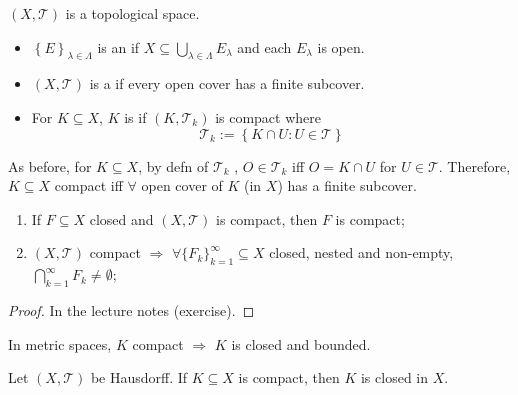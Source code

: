  \begin{defn} 
    $(X, \mathcal{T})$ is a topological space. 
    \begin{itemize}
        \item $\left\{ E \right\}_{\lambda \in \Lambda}$ is an  if 
        $X \subseteq \bigcup_{\lambda \in \Lambda} E_\lambda$ and each $E_\lambda$ is open.
        \item $(X, \mathcal{T})$ is a  if every open cover has a 
        finite subcover.   
        \item For $K \subseteq X$, $K$ is  if $(K, \mathcal{T}_k)$ is compact where
        \[
            \mathcal{T}_k := \left\{ K \cap U : U \in \mathcal{T} \right\} 
        \]    
    \end{itemize} 
 \end{defn}

 \begin{rem}
    As before, for $K \subseteq X$, by defn of $\mathcal{T}_k$ , $O \in \mathcal{T}_k$ iff $O = 
    K \cap U$ for $U \in \mathcal{T}$. Therefore, $K \subseteq X$ compact iff $\forall$ open cover
    of $K$ (in $X$) has a finite subcover.       
 \end{rem}

\begin{prop} 
    \begin{enumerate}
        \item If $F \subseteq X$ closed and $(X, \mathcal{T})$ is compact, then $F$ is compact;
        \item $(X, \mathcal{T})$ compact $\Rightarrow$ $\forall \{F_{k}\}_{k=1}^{\infty} \subseteq X$
        closed, nested and non-empty, $\bigcap_{k=1}^{\infty} F_k \neq \emptyset$;   
    \end{enumerate}
\end{prop}

\begin{proof}
    In the lecture notes (exercise).
\end{proof}

In metric spaces, $K $ compact $\Rightarrow$ $K$ is closed and bounded.

\begin{prop}
    Let $(X, \mathcal{T})$ be Hausdorff. If $K \subseteq X$ is compact, then $K$ is closed in $X$. 
\end{prop}

